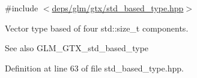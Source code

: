 {\ttfamily \#include $<$\hyperlink{std__based__type_8hpp}{deps/glm/gtx/std\+\_\+based\+\_\+type.\+hpp}$>$}

Vector type based of four std\+::size\+\_\+t components. \begin{DoxySeeAlso}{See also}
G\+L\+M\+\_\+\+G\+T\+X\+\_\+std\+\_\+based\+\_\+type 
\end{DoxySeeAlso}


Definition at line 63 of file std\+\_\+based\+\_\+type.\+hpp.

